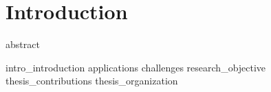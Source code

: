 \chapter{Introduction}
\label{chapter:introduction}
\glsresetall
{abstract}



\clearpage
\glsresetall
{intro_introduction}
{applications}
{challenges}
{research_objective}
{thesis_contributions}
{thesis_organization}
